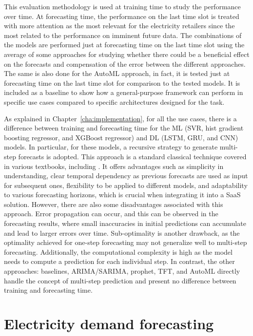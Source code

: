 This evaluation methodology is used at training time to study the performance over time.
At forecasting time, the performance on the last time slot is treated with more attention as the most relevant for the electricity retailers since the most related to the performance on imminent future data.
The combinations of the models are performed just at forecasting time on the last time slot using the average of some approaches for studying whether there could be a beneficial effect on the forecasts and compensation of the error between the different approaches.
The same is also done for the AutoML approach, in fact, it is tested just at forecasting time on the last time slot for comparison to the tested models.
It is included as a baseline to show how a general-purpose framework can perform in specific use cases compared to specific architectures designed for the task.

As explained in Chapter~\ref{cha:implementation}, for all the use cases, there is a difference between training and forecasting time for the ML (SVR, hist gradient boosting regressor, and XGBoost regressor) and DL (LSTM, GRU, and CNN) models.
In particular, for these models, a recursive strategy to generate multi-step forecasts is adopted.
This approach is a standard classical technique covered in various textbooks, including \cite{Manu2022}.
It offers advantages such as simplicity in understanding, clear temporal dependency as previous forecasts are used as input for subsequent ones, flexibility to be applied to different models, and adaptability to various forecasting horizons, which is crucial when integrating it into a SaaS solution.
However, there are also some disadvantages associated with this approach.
Error propagation can occur, and this can be observed in the forecasting results, where small inaccuracies in initial predictions can accumulate and lead to larger errors over time.
Sub-optimality is another drawback, as the optimality achieved for one-step forecasting may not generalize well to multi-step forecasting.
Additionally, the computational complexity is high as the model needs to compute a prediction for each individual step.
In contrast, the other approaches: baselines, ARIMA/SARIMA, prophet, TFT, and AutoML directly handle the concept of multi-step prediction and present no difference between training and forecasting time.


\section{Electricity demand forecasting}
\label{sec:demandval}
\vspace{0.2 cm}

